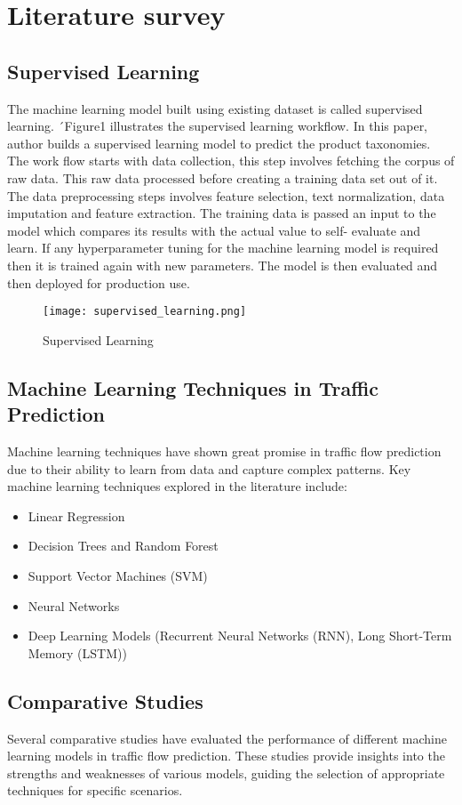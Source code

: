 \chapter{Literature survey}

\section{Supervised Learning}

The machine learning model built using existing dataset is called supervised learning. ´Figure1 illustrates the supervised learning workflow. In this paper, author builds a supervised learning model to predict the product taxonomies. The work flow starts with data collection, this step involves fetching the corpus of raw data. This raw data processed before creating a training data set out of it. The data preprocessing steps involves feature selection, text normalization, data imputation and feature extraction. The training data is passed an input to the model which compares its results with the actual value to self- evaluate and learn. If any hyperparameter tuning for the machine learning model is required then it is trained again with new parameters. The model is then evaluated and then deployed for production use.
\begin{figure}[h!]
    \centering    
    \texttt{[image: supervised\_learning.png]}
    \caption{Supervised Learning}
\end{figure}


\section{Machine Learning Techniques in Traffic Prediction}

Machine learning techniques have shown great promise in traffic flow prediction due to their ability to learn from data and capture complex patterns. Key machine learning techniques explored in the literature include:

\begin{itemize}
    \item Linear Regression
    \item Decision Trees and Random Forest
    \item Support Vector Machines (SVM)
    \item Neural Networks
    \item Deep Learning Models (Recurrent Neural Networks (RNN), Long Short-Term Memory (LSTM))
 
    

\end{itemize}

\section{Comparative Studies}

Several comparative studies have evaluated the performance of different machine learning models in traffic flow prediction. These studies provide insights into the strengths and weaknesses of various models, guiding the selection of appropriate techniques for specific scenarios.



